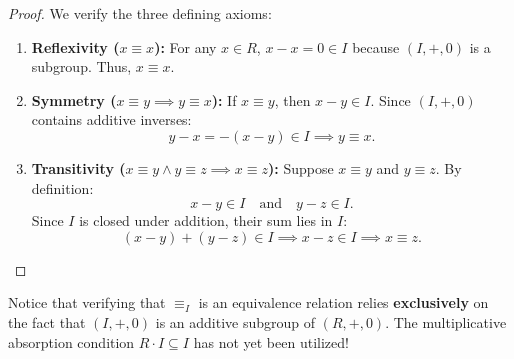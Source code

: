 \begin{content}

\begin{proof}
We verify the three defining axioms:
\begin{enumerate}[label=\textbf{(\arabic*)}]
    \item \textbf{Reflexivity ($x \equiv x$):}
    For any $x \in R$, $x - x = 0 \in I$ because $(I, +, 0)$ is a subgroup. Thus, $x \equiv x$.
    \item \textbf{Symmetry ($x \equiv y \implies y \equiv x$):}
    If $x \equiv y$, then $x - y \in I$. Since $(I, +, 0)$ contains additive inverses:
    \[
    y - x = -(x - y) \in I \implies y \equiv x.
    \]
    \item \textbf{Transitivity ($x \equiv y \land y \equiv z \implies x \equiv z$):}
    Suppose $x \equiv y$ and $y \equiv z$. By definition:
    \[
    x - y \in I \quad \text{and} \quad y - z \in I.
    \]
    Since $I$ is closed under addition, their sum lies in $I$:
    \[
    (x - y) + (y - z) \in I \implies x - z \in I \implies x \equiv z.
    \]
\end{enumerate}
\end{proof}

\begin{steps}
Notice that verifying that $\equiv_I$ is an equivalence relation relies \textbf{exclusively} on the fact that $(I, +, 0)$ is an additive subgroup of $(R, +, 0)$. The multiplicative absorption condition $R \cdot I \subseteq I$ has not yet been utilized!
\end{steps}
\end{content}

\begin{hidden}
\end{hidden}

